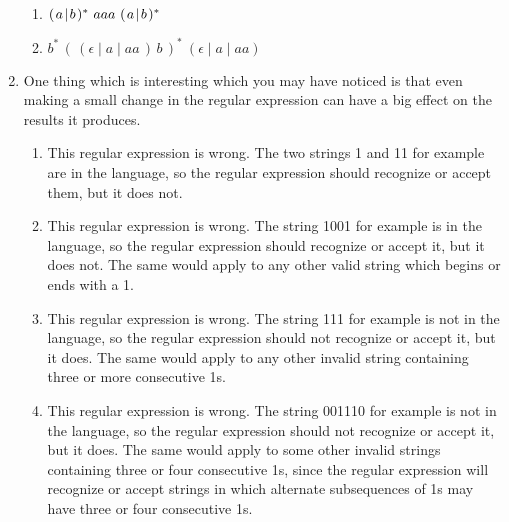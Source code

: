 \documentclass[11pt]{article}
\begin{document}
\begin{enumerate}
\begin{enumerate}
            \item \(
                    \common^{*} \ aaa \ \common^{*}
                  \)

            \item \(
                    b^{*} \, ( \, ( \epsilon \mid a \mid aa \, ) \, b \, )^* \
                    ( \epsilon \mid a \mid aa )
                  \)

          \end{enumerate}

    \item One thing which is interesting which you may have noticed is that
          even making a small change in the regular expression can have a
          big effect on the results it produces.

          \vspace{-1.5mm}

          \begin{enumerate}

            \addtolength{\itemsep}{2mm}

            \item This regular expression is wrong.  The two strings 1 and
                  11 for example are in the language, so the regular
                  expression should recognize or accept them, but it does
                  not.

            \item This regular expression is wrong.  The string 1001 for
                  example is in the language, so the regular expression
                  should recognize or accept it, but it does not.  The same
                  would apply to any other valid string which begins or ends
                  with a 1.

            \item This regular expression is wrong.  The string 111 for
                  example is not in the language, so the regular expression
                  should not recognize or accept it, but it does.  The same
                  would apply to any other invalid string containing three
                  or more consecutive 1s.

            \item This regular expression is wrong.  The string 001110 for
                  example is not in the language, so the regular expression
                  should not recognize or accept it, but it does.  The same
                  would apply to some other invalid strings containing three
                  or four consecutive 1s, since the regular expression will
                  recognize or accept strings in which alternate
                  subsequences of 1s may have three or four consecutive 1s.


\end{enumerate}
\end{enumerate}
\end{document}
